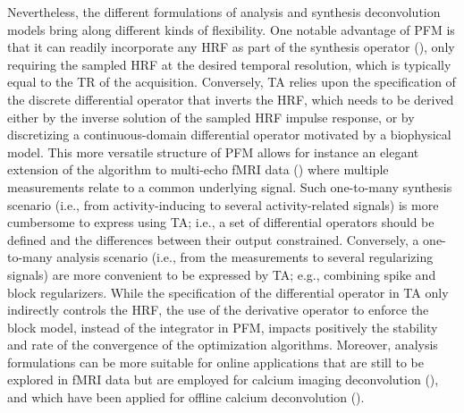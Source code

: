 Nevertheless, the different formulations of analysis and synthesis deconvolution models bring along different kinds of flexibility. One notable advantage of PFM is that it can readily incorporate any HRF as part of the synthesis operator (\citealt{Elad2007Analysisversussynthesis}), only requiring the sampled HRF at the desired temporal resolution, which is typically equal to the TR of the acquisition. Conversely, TA relies upon the specification of the discrete differential operator that inverts the HRF, which needs to be derived either by the inverse solution of the sampled HRF impulse response, or by discretizing a continuous-domain differential operator motivated by a biophysical model. This more versatile structure of PFM allows for instance an elegant extension of the algorithm to multi-echo fMRI data (\citealt{CaballeroGaudes2019deconvolutionalgorithmmulti}) where multiple measurements relate to a common underlying signal. Such one-to-many synthesis scenario (i.e., from activity-inducing to several activity-related signals) is more cumbersome to express using TA; i.e., a set of differential operators should be defined and the differences between their output constrained. Conversely, a one-to-many analysis scenario (i.e., from the measurements to several regularizing signals) are more convenient to be expressed by TA; e.g., combining spike and block regularizers. 
While the specification of the differential operator in TA only indirectly controls the HRF, the use of the derivative operator to enforce the block model, instead of the integrator in PFM, impacts positively the stability and rate of the convergence of the optimization algorithms. Moreover, analysis formulations can be more suitable for online applications that are still to be explored in fMRI data but are employed for calcium imaging deconvolution (\citealt{Friedrich_2017,Jewell_2019}), and which have been applied for offline calcium deconvolution (\citealt{Farouj2020DeconvolutionSustainedNeural}).

